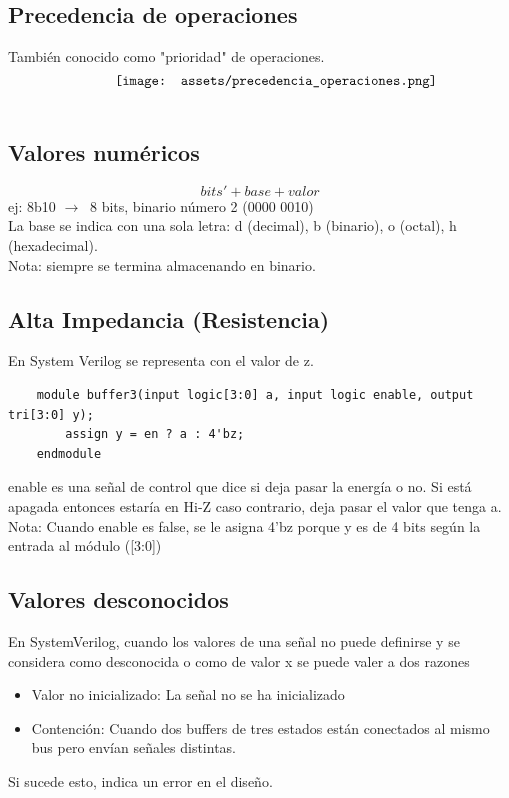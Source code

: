 \documentclass[10pt,a4paper]{article}
\begin{document}
\subsection*{Precedencia de operaciones}
También conocido como "prioridad" de operaciones.
\[\begin{minipage}[b]{0.6\textwidth}
    \texttt{[image: assets/precedencia\_operaciones.png]}
    \label{fig:precedencia_operaciones}
\end{minipage}\]
\subsection*{Valores numéricos}
\[bits' + base + valor\]
ej: 8b10 $ \rightarrow \ $ 8 bits, binario número 2 (0000 0010) \\ 
La base se indica con una sola letra: d (decimal), b (binario), o (octal), h (hexadecimal). \\
Nota: siempre se termina almacenando en binario. 
\subsection*{Alta Impedancia (Resistencia)}
En System Verilog se representa con el valor de z. \\
\begin{lstlisting}
    module buffer3(input logic[3:0] a, input logic enable, output tri[3:0] y);
        assign y = en ? a : 4'bz;
    endmodule
\end{lstlisting}
enable es una señal de control que dice si deja pasar la energía o no. Si está apagada entonces estaría en Hi-Z caso contrario, deja pasar el valor que tenga a. \\ 
Nota: Cuando enable es false, se le asigna 4'bz porque y es de 4 bits según la entrada al módulo ([3:0])
\subsection*{Valores desconocidos}
En SystemVerilog, cuando los valores de una señal no puede definirse y se considera como desconocida o como de valor x se puede valer a dos razones 
\begin{itemize}
    \item Valor no inicializado: La señal no se ha inicializado
    \item Contención: Cuando dos buffers de tres estados están conectados al mismo bus pero envían señales distintas.
\end{itemize}
Si sucede esto, indica un error en el diseño. 
\end{document}
